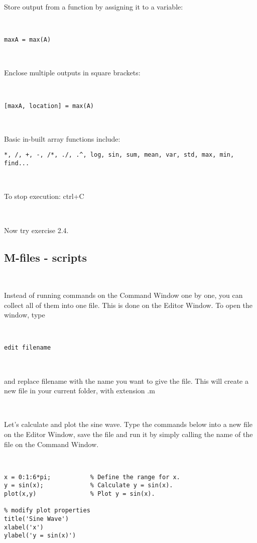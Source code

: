 \documentclass[11pt]{amsart}
\begin{document}
Store output from a function by assigning it to a variable: 

\

\color{blue}
\begin{verbatim}
maxA = max(A)
 \end{verbatim}
\color{black}

\

Enclose multiple outputs in square brackets: 

\

\color{blue}
\begin{verbatim}
[maxA, location] = max(A)
 \end{verbatim}
\color{black}

\

Basic in-built array functions include: \begin{verbatim}*, /, +, -, /*, ./, .^, log, sin, sum, mean, var, std, max, min, find...\end{verbatim}
 
 \
 
To stop execution: ctrl+C

\

Now try exercise 2.4.

\subsection{M-files - scripts}

\

Instead of running commands on the Command Window one by one, you can collect all of them into one file. This is done on the Editor Window. To open the window, type 

\

\color{blue}
\begin{verbatim}
edit filename
\end{verbatim}
\color{black}

\

and replace filename with the name you want to give the file. This will create a new file in your current folder, with extension .m

\


Let's calculate and plot the sine wave. Type the commands below into a new file on the Editor Window, save the file and run it by simply calling the name of the file on the Command Window.

\

\color{blue}
\begin{verbatim}
x = 0:1:6*pi;           % Define the range for x.
y = sin(x);             % Calculate y = sin(x).
plot(x,y)               % Plot y = sin(x).
 
% modify plot properties
title('Sine Wave')
xlabel('x')
ylabel('y = sin(x)')
\end{verbatim}
\color{black}
\end{document}
